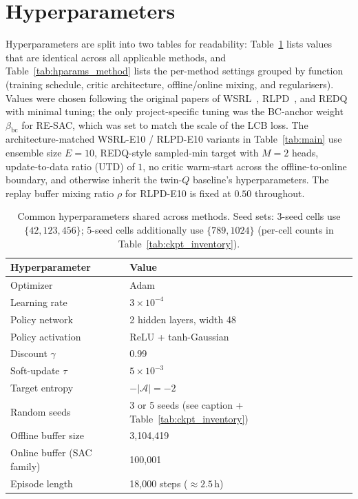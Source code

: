 \documentclass[journal,10pt]{IEEEtran}
\begin{document}
{\small


}

\clearpage
\appendices

\section{Hyperparameters}
\label{app:hparams}

Hyperparameters are split into two tables for readability: Table~\ref{tab:hparams_common} lists values that are identical across all applicable methods, and Table~\ref{tab:hparams_method} lists the per-method settings grouped by function (training schedule, critic architecture, offline/online mixing, and regularisers). Values were chosen following the original papers of WSRL~\cite{zhou2024efficient}, RLPD~\cite{ball2023efficient}, and REDQ~\cite{chen2021randomized} with minimal tuning; the only project-specific tuning was the BC-anchor weight $\beta_{\text{bc}}$ for RE-SAC, which was set to match the scale of the LCB loss. The architecture-matched WSRL-E10 / RLPD-E10 variants in Table~\ref{tab:main} use ensemble size $E{=}10$, REDQ-style sampled-min target with $M{=}2$ heads, update-to-data ratio (UTD) of $1$, no critic warm-start across the offline-to-online boundary, and otherwise inherit the twin-$Q$ baseline's hyperparameters. The replay buffer mixing ratio $\rho$ for RLPD-E10 is fixed at $0.50$ throughout.

\begin{table}[!htbp]
\centering
\caption{Common hyperparameters shared across methods. Seed sets: 3-seed cells use $\{42,123,456\}$; 5-seed cells additionally use $\{789,1024\}$ (per-cell counts in Table~\ref{tab:ckpt_inventory}).}
\label{tab:hparams_common}
\footnotesize
\setlength{\tabcolsep}{4pt}
\begin{tabular}{@{}ll@{}}
\toprule
Hyperparameter & Value \\
\midrule
Optimizer & Adam \\
Learning rate & $3 \times 10^{-4}$ \\
Policy network & 2 hidden layers, width 48 \\
Policy activation & ReLU + tanh-Gaussian \\
Discount $\gamma$ & 0.99 \\
Soft-update $\tau$ & $5 \times 10^{-3}$ \\
Target entropy & $-|\mathcal{A}| = -2$ \\
Random seeds & 3 or 5 seeds (see caption + Table~\ref{tab:ckpt_inventory}) \\
Offline buffer size & 3{,}104{,}419 \\
Online buffer (SAC family) & 100{,}001 \\
Episode length & 18{,}000 steps ($\approx 2.5$\,h) \\
\bottomrule
\end{tabular}
\end{table}
\end{document}
